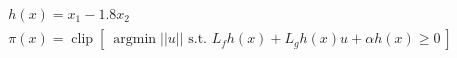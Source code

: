 \documentclass[preview]{standalone}
\begin{document}
\begin{align*}
&h(x) = x_1 - 1.8x_2\\ &\pi(x) = \operatorname{clip}[ \ \operatorname{argmin} ||u|| \text{ s.t. } L_fh(x) + L_gh(x) u + \alpha h(x) \geq 0 \ ]
\end{align*}
\end{document}
